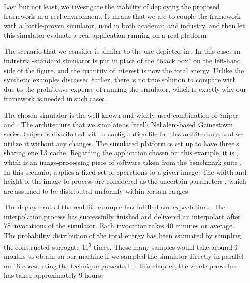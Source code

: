 Last but not least, we investigate the viability of deploying the proposed
framework in a real environment. It means that we are to couple the framework
with a battle-proven simulator, used in both academia and industry, and then let
this simulator evaluate a real application running on a real platform.

The scenario that we consider is similar to the one depicted in
. In this case, an industrial-standard simulator
is put in place of the ``black box'' on the left-hand side of the figure, and
the quantity of interest \g is now the total energy. Unlike the synthetic
examples discussed earlier, there is no true solution to compare with due to the
prohibitive expense of running the simulator, which is exactly why our framework
is needed in such cases.

The chosen simulator is the well-known and widely used combination of Sniper
\cite{carlson2011} and  \cite{li2009}. The architecture that we
simulate is Intel's Nehalem-based Gainestown series. Sniper is distributed with
a configuration file for this architecture, and we utilize it without any
changes. The simulated platform is set up to have three s sharing one L3
cache. Regarding the application chosen for this example, it is , which
is an image-processing piece of software taken from the  benchmark
suite \cite{bienia2011}. In this scenario,  applies a fixed set of
operations to a given image. The width and height of the image to process are
considered as the uncertain parameters \vu, which are assumed to be distributed
uniformly within certain ranges.

The deployment of the real-life example has fulfilled our expectations. The
interpolation process has successfully finished and delivered an interpolant
after 78 invocations of the simulator. Each invocation takes 40 minutes on
average. The probability distribution of the total energy has been estimated by
sampling the constructed surrogate 10\textsuperscript{5} times. These many
samples would take around 6 months to obtain on our machine if we sampled the
simulator directly in parallel on 16 cores; using the technique presented in
this chapter, the whole procedure has taken approximately 9 hours.
